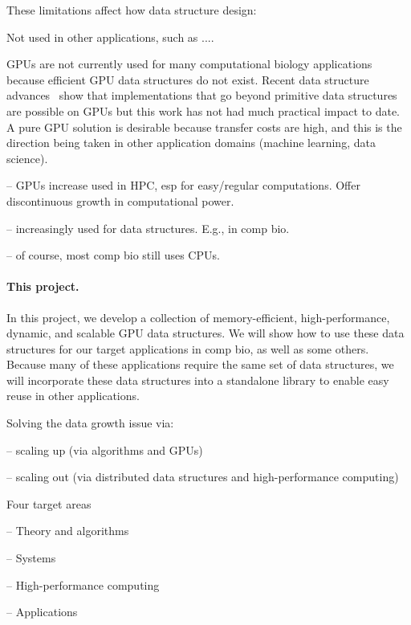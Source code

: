 These limitations affect how data structure design: 

Not used in other applications, such as ....


GPUs are not currently used for many
computational biology applications because efficient GPU data structures do not
exist.
Recent data structure advances~\cite{cite-something} show that
implementations that go beyond primitive data structures are possible on GPUs
but this work has not had much practical impact to date. A pure GPU solution is
desirable because transfer costs are high, and this is the direction being taken
in other application domains (machine learning, data science).


-- GPUs increase used in HPC, esp for easy/regular computations. Offer discontinuous growth in computational power.

-- increasingly used for data structures. E.g., in comp bio.

-- of course, most comp bio still uses CPUs.



\paragraph{This project.} 
In this project, we develop a  collection of
memory-efficient, high-performance, dynamic, and scalable GPU data structures.
We will show how to use these data structures for our target applications in comp bio, as well as some others. 
Because many of these applications require the same set of data structures, we will incorporate these data structures into a standalone library to enable easy reuse in other applications.


Solving the data growth issue via: 

-- scaling up  (via algorithms and GPUs)

-- scaling out (via distributed data structures and high-performance computing)

Four target areas

-- Theory and algorithms

-- Systems

-- High-performance computing

-- Applications









